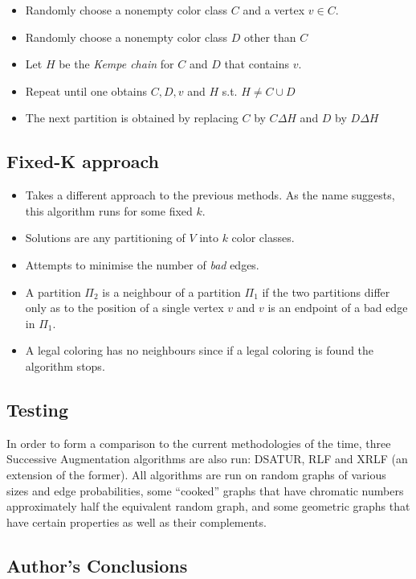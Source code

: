 \begin{itemize}
	\item Randomly choose a nonempty color class $C$ and a vertex $v \in C$.
	\item Randomly choose a nonempty color class $D$ other than $C$
	\item Let $H$ be the \emph{Kempe chain} for $C$ and $D$ that contains $v$.
	\item Repeat until one obtains $C , D , v$ and $H$ s.t. $H \neq C \cup D$
	\item The next partition is obtained by replacing $C$ by $C \Delta H$ and $D$ by $D \Delta H$ 
	\end{itemize}

\subsection{Fixed-K approach}
	\begin{itemize}
	\item Takes a different approach to the previous methods. As the name suggests, this algorithm runs for some fixed $k$.
	\item Solutions are any partitioning of $V$ into $k$ color classes.
	\item Attempts to minimise the number of \emph{bad} edges.
	\item A partition $\Pi_2$ is a neighbour of a partition $\Pi_1$ if the two partitions differ only as to the position of a single vertex $v$ and $v$ is an endpoint of a bad edge in $\Pi_1$.
	\item A legal coloring has no neighbours since if a legal coloring is found the algorithm stops.
	\end{itemize}

\subsection{Testing}

In order to form a comparison to the current methodologies of the time, three Successive Augmentation algorithms are also run: DSATUR, RLF and XRLF (an extension of the former).
All algorithms are run on random graphs of various sizes and edge probabilities, some ``cooked'' graphs that have chromatic numbers approximately half the equivalent random graph, and some geometric graphs that have certain properties as well as their complements.

\subsection{Author's Conclusions}

